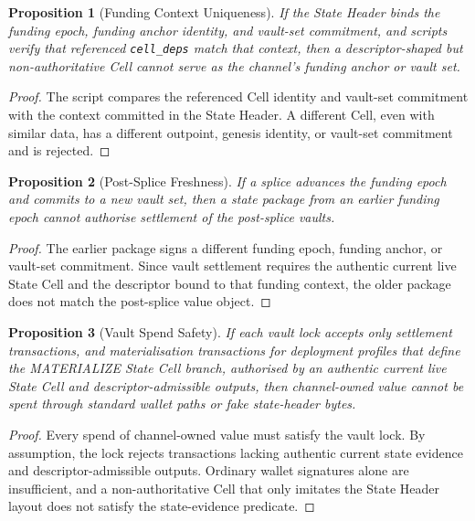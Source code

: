 \documentclass[a4paper,11pt]{article}
\newtheorem{proposition}{Proposition}
\begin{document}
\begin{proposition}[Funding Context Uniqueness]
If the State Header binds the funding epoch, funding anchor identity, and vault-set commitment, and scripts verify that referenced \texttt{cell\_deps} match that context, then a descriptor-shaped but non-authoritative Cell cannot serve as the channel's funding anchor or vault set.
\end{proposition}

\begin{proof}
The script compares the referenced Cell identity and vault-set commitment with the context committed in the State Header. A different Cell, even with similar data, has a different outpoint, genesis identity, or vault-set commitment and is rejected.
\end{proof}

\begin{proposition}[Post-Splice Freshness]
If a splice advances the funding epoch and commits to a new vault set, then a state package from an earlier funding epoch cannot authorise settlement of the post-splice vaults.
\end{proposition}

\begin{proof}
The earlier package signs a different funding epoch, funding anchor, or vault-set commitment. Since vault settlement requires the authentic current live State Cell and the descriptor bound to that funding context, the older package does not match the post-splice value object.
\end{proof}

\begin{proposition}[Vault Spend Safety]
If each vault lock accepts only settlement transactions, and materialisation transactions for deployment profiles that define the \textsf{MATERIALIZE} State Cell branch, authorised by an authentic current live State Cell and descriptor-admissible outputs, then channel-owned value cannot be spent through standard wallet paths or fake state-header bytes.
\end{proposition}

\begin{proof}
Every spend of channel-owned value must satisfy the vault lock. By assumption, the lock rejects transactions lacking authentic current state evidence and descriptor-admissible outputs. Ordinary wallet signatures alone are insufficient, and a non-authoritative Cell that only imitates the State Header layout does not satisfy the state-evidence predicate.
\end{proof}
\end{document}
